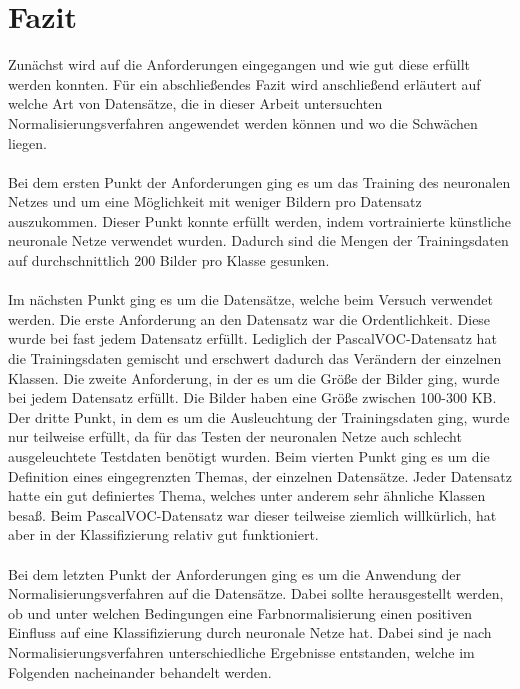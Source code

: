 \chapter{Fazit}\label{s.fazit}
Zunächst wird auf die Anforderungen eingegangen und wie gut diese erfüllt werden konnten.
Für ein abschließendes Fazit wird anschließend erläutert auf welche Art von Datensätze, die in dieser Arbeit untersuchten Normalisierungsverfahren angewendet werden können und wo die Schwächen liegen.\\\\
Bei dem ersten Punkt der Anforderungen ging es um das Training des neuronalen Netzes und um eine Möglichkeit mit weniger Bildern pro Datensatz auszukommen. Dieser Punkt konnte erfüllt werden, indem vortrainierte künstliche neuronale Netze verwendet wurden. Dadurch sind die Mengen der Trainingsdaten auf durchschnittlich 200 Bilder pro Klasse gesunken.\\\\
Im nächsten Punkt ging es um die Datensätze, welche beim Versuch verwendet werden. Die erste Anforderung an den Datensatz war die Ordentlichkeit. Diese wurde bei fast jedem Datensatz erfüllt. Lediglich der PascalVOC-Datensatz hat die Trainingsdaten gemischt und erschwert dadurch das Verändern der einzelnen Klassen. Die zweite Anforderung, in der es um die Größe der Bilder ging, wurde bei jedem Datensatz erfüllt. Die Bilder haben eine Größe zwischen 100-300 KB. Der dritte Punkt, in dem es um die Ausleuchtung der Trainingsdaten ging, wurde nur teilweise erfüllt, da für das Testen der neuronalen Netze auch schlecht ausgeleuchtete Testdaten benötigt wurden. Beim vierten Punkt ging es um die Definition eines eingegrenzten Themas, der einzelnen Datensätze. Jeder Datensatz hatte ein gut definiertes Thema, welches unter anderem sehr ähnliche Klassen besaß. Beim PascalVOC-Datensatz war dieser teilweise ziemlich willkürlich, hat aber in der Klassifizierung relativ gut funktioniert.\\\\
Bei dem letzten Punkt der Anforderungen ging es um die Anwendung der Normalisierungsverfahren auf die Datensätze. Dabei sollte herausgestellt werden, ob und unter welchen Bedingungen eine Farbnormalisierung einen positiven Einfluss auf eine Klassifizierung durch neuronale Netze hat. Dabei sind je nach Normalisierungsverfahren unterschiedliche Ergebnisse entstanden, welche im Folgenden nacheinander behandelt werden.\\\\
